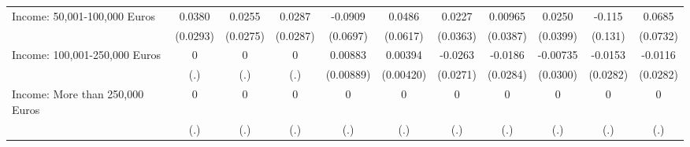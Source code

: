 {\begin{tabular}{l*{10}{c}}
Income: 50,001-100,000 Euros&      0.0380         &      0.0255         &      0.0287         &     -0.0909         &      0.0486         &      0.0227         &     0.00965         &      0.0250         &      -0.115         &      0.0685         \\
            &    (0.0293)         &    (0.0275)         &    (0.0287)         &    (0.0697)         &    (0.0617)         &    (0.0363)         &    (0.0387)         &    (0.0399)         &     (0.131)         &    (0.0732)         \\
\addlinespace
Income: 100,001-250,000 Euros&           0         &           0         &           0         &     0.00883         &     0.00394         &     -0.0263         &     -0.0186         &    -0.00735         &     -0.0153         &     -0.0116         \\
            &         (.)         &         (.)         &         (.)         &   (0.00889)         &   (0.00420)         &    (0.0271)         &    (0.0284)         &    (0.0300)         &    (0.0282)         &    (0.0282)         \\
\addlinespace
Income: More than 250,000 Euros&           0         &           0         &           0         &           0         &           0         &           0         &           0         &           0         &           0         &           0         \\
            &         (.)         &         (.)         &         (.)         &         (.)         &         (.)         &         (.)         &         (.)         &         (.)         &         (.)         &         (.)         \\
\bottomrule
\end{tabular}
}
